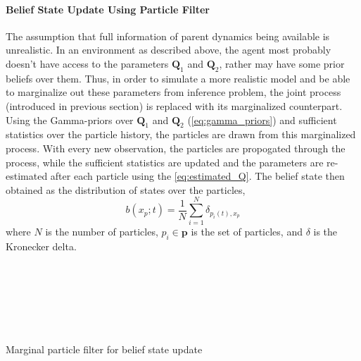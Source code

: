 \paragraph*{Belief State Update Using Particle Filter}
\label{par:bs_partFilt}
The assumption that full information of parent dynamics being available is unrealistic. In an environment as described above, the agent most probably doesn't have access to the parameters $ \textbf{Q}_1 $ and $ \textbf{Q}_2 $, rather may have some prior beliefs over them. Thus, in order to simulate a more realistic model and be able to marginalize out these parameters from inference problem, the joint process (introduced in previous section) is replaced with its marginalized counterpart. Using the Gamma-priors over $ \textbf{Q}_1 $ and $ \textbf{Q}_2 $ (\autoref{eq:gamma_priors}) and sufficient statistics over the particle history, the particles are drawn from this marginalized process. With every new observation, the particles are propogated through the process, while the sufficient statistics are updated and the parameters are re-estimated after each particle using the \autoref{eq:estimated_Q}. The belief state then obtained as the distribution of states over the particles,
\begin{equation}
b(x_p; t) = \frac{1}{N} \sum_{i=1}^{N} \delta_{p_i(t), x_p}
\end{equation}
where $ N $ is the number of particles, $ p_i \in \textbf{p} $ is the set of particles, and $\delta$ is the Kronecker delta.
\begin{algorithm}[H]
	
	\vspace{+4pt}
	\begin{algorithmic}[1]
		\\
		
		 \\
		\ENDFOR \\
		\\
		\\
		\ENDFOR 
	\end{algorithmic}
	\caption{Marginal particle filter for belief state update}
\end{algorithm}

